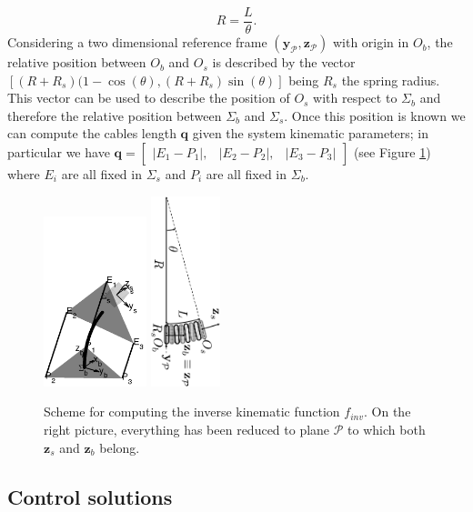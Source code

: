 \documentclass[conference]{IEEEtran}
\numberwithin{equation}{section}
\newcommand{\q}{\mathbf{q}}
\begin{document}
$$ R = \frac{L}{\theta}.$$
Considering a two dimensional reference frame $(\mathbf y_{\mathcal P}, \mathbf z_{\mathcal P})$ with origin in $O_b$, the relative position between $O_b$ and $O_s$ is described by the vector $[(R+R_s) (1 - \cos(\theta), (R+R_s) \sin(\theta)]$ being $R_s$ the spring radius. This vector can be used to describe the position of $O_s$ with respect to $\Sigma_b$ and therefore the relative position between $\Sigma_b$ and $\Sigma_s$. Once this position is known we can compute the cables length $\q$ given the system kinematic parameters; in particular we have $\q = \begin{bmatrix} |E_1-P_1|, & |E_2-P_2|, & |E_3-P_3| \end{bmatrix} $ (see Figure \ref{Fig:HeadActCalc}) where $E_i$ are all fixed in $\Sigma_s$ and $P_i$ are all fixed in $\Sigma_b$.


\begin{figure}[tbp]
\centering
\includegraphics[width=30mm]{image/NeckModel.pdf} 
\includegraphics[width=20mm, angle=90]{image/NeckModelCalc.pdf} 
\caption{Scheme for computing the inverse kinematic function $f_{inv}$. On the right picture, everything has been reduced to plane $\mathcal P$ to which both $\mathbf z_s$ and $\mathbf z_b$ belong.}
\label{Fig:HeadActCalc}
\end{figure}

\subsection{Control solutions} \label{Sec:ControlSolutions}
\end{document}
